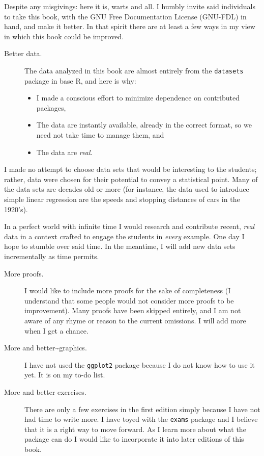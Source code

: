 \documentclass[captions=tableheading]{scrbook}
\begin{document}
Despite any misgivings: here it is, warts and all. I humbly invite said individuals to take this book, with the GNU Free Documentation License (GNU-FDL) in hand, and make it better. In that spirit there are at least a few ways in my view in which this book could be improved.

\begin{description}
\item[Better data.] The data analyzed in this book are almost entirely from the \texttt{datasets} package in base \textsf{R}, and here is why:
\begin{itemize}
\item I made a conscious effort to minimize dependence on contributed packages,
\item The data are instantly available, already in the correct format, so we need not take time to manage them, and
\item The data are \emph{real}.
\end{itemize}
\end{description}

I made no attempt to choose data sets that would be interesting to the students; rather, data were chosen for their potential to convey a statistical point. Many of the data sets are decades old or more (for instance, the data used to introduce simple linear regression are the speeds and stopping distances of cars in the 1920's).

In a perfect world with infinite time I would research and contribute recent, \emph{real} data in a context crafted to engage the students in \emph{every} example. One day I hope to stumble over said time. In the meantime, I will add new data sets incrementally as time permits.

\begin{description}
\item[More proofs.] I would like to include more proofs for the sake of completeness (I understand that some people would not consider more proofs to be improvement). Many proofs have been skipped entirely, and I am not aware of any rhyme or reason to the current omissions. I will add more when I get a chance.
\item[More and better\~{}graphics.] I have not used the \texttt{ggplot2} package \cite{Wickam2009} because I do not know how to use it yet. It is on my to-do list.
\item[More and better exercises.] There are only a few exercises in the first edition simply because I have not had time to write more. I have toyed with the \texttt{exams} package \cite{exams} and I believe that it is a right way to move forward. As I learn more about what the package can do I would like to incorporate it into later editions of this book.
\end{description}
\end{document}
